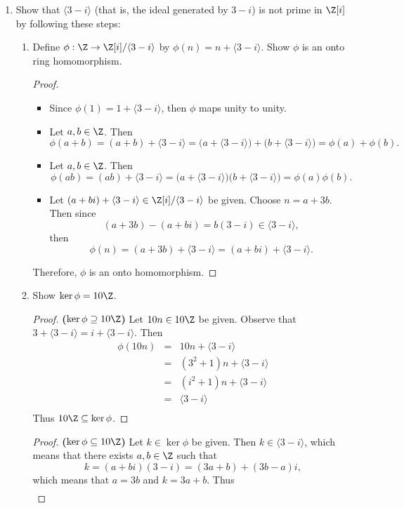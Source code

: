 \documentclass[letterpaper]{article}
\begin{document}
\begin{enumerate}
  \item Show that $\langle3-i\rangle$ (that is, the ideal generated by $3 - i$) is not prime in $\Z[i]$ by following these steps:
	\begin{enumerate}[label=\alph*.]
  	\item Define $\phi:\Z\to\Z[i]/\langle3-i\rangle$ by $\phi(n)=n+\langle3-i\rangle$. Show $\phi$ is an onto ring homomorphism.
  	\begin{proof}\mbox{}
    	\begin{itemize}
    		\item Since $\phi(1)=1+\langle3-i\rangle$, then $\phi$ maps unity to unity.
    		\item Let $a, b \in \Z$. Then
    		$$\phi(a+b)=(a+b)+\langle3-i\rangle=\big(a+\langle3-i\rangle\big)+\big(b+\langle3-i\rangle\big)=\phi(a)+\phi(b).$$
    		\item Let $a, b \in \Z$. Then
    		$$\phi(ab)=(ab)+\langle3-i\rangle=\big(a+\langle3-i\rangle\big)\big(b+\langle3-i\rangle\big)=\phi(a)\phi(b).$$
    		\item Let $(a+bi)+\langle3-i\rangle\in\Z[i]/\langle3-i\rangle$ be given. Choose $n=a+3b$. Then since $$(a+3b)-(a+bi)=b(3-i)\in\langle3-i\rangle,$$ then $$\phi(n)=(a+3b)+\langle3-i\rangle=(a+bi)+\langle3-i\rangle.$$
    	\end{itemize}
    	Therefore, $\phi$ is an onto homomorphism.
  	\end{proof}
    \item Show $\ker\phi=10\Z$.
    \begin{proof}\textbf{($\ker\phi\supseteq10\Z$)} 
    	Let $10n\in10\Z$ be given. Observe that $3+\langle3-i\rangle=i+\langle3-i\rangle$. Then 
    	\[\begin{array}{rcl}
    	\phi(10n)&=&10n+\langle3-i\rangle\\
    	&=&(3^2+1)n+\langle3-i\rangle\\
    	&=&(i^2+1)n+\langle3-i\rangle\\
    	&=&\langle3-i\rangle\\
    	\end{array}\]
			Thus $10\Z\subseteq\ker\phi$.
    \end{proof}
    \begin{proof}\textbf{($\ker\phi\subseteq10\Z$)} 
    	Let $k\in\ker\phi$ be given. Then $k\in\langle3-i\rangle$, which means that there exists $a,b\in\Z$ such that 
    	$$k=(a+bi)(3-i)=(3a+b)+(3b-a)i,$$
    	which means that $a=3b$ and $k=3a+b$. Thus
    	\[\begin{array}{rcl}

\end{array}\]
\end{proof}
\end{enumerate}
\end{enumerate}
\end{document}
